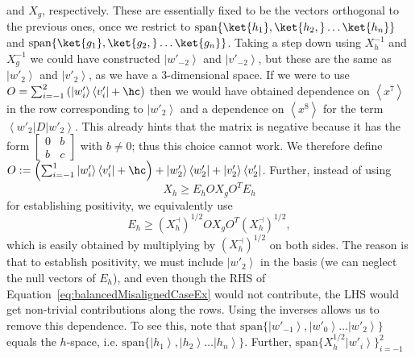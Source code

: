 \documentclass{article}
\begin{document}
and $X_{g}$, respectively. These are essentially fixed to be the vectors orthogonal to the previous ones, once we restrict to $\text{span}\{\ket{h_1},\ket{h_2,}\ldots\ket{h_n}\}$ and $\text{span}\{\ket{g_1},\ket{g_2,}\ldots\ket{g_n}\}$.  Taking a step down using $X_{h}^{-1}$ and $X_{g}^{-1}$ we could
have constructed $\left|w'_{-2}\right\rangle $ and $\left|v'_{-2}\right\rangle $, but these are the same as $\left|w'_{2}\right\rangle $
and $\left|v'_{2}\right\rangle$, as we have a 3-dimensional space. If
we were to use $O=\sum_{i=-1}^{2}\left(\left|w'_{i}\right\rangle \left\langle v'_{i}\right|+\hc\right)$
then we would have obtained dependence on $\left\langle x^{7}\right\rangle $
in the row corresponding to $\left|w'_{2}\right\rangle $ and
a dependence on $\left\langle x^{8}\right\rangle $ for the term
$\left\langle w'_{2}\right|D\left|w'_{2}\right\rangle $. This
already hints that the matrix is negative because it has the form
$\left[\begin{array}{cc}
      0 & b \\
      b & c
    \end{array}\right]$ with $b\neq0$; thus this choice cannot work. We therefore
define $O:=\left(\sum_{i=-1}^{1}\left|w'_{i}\right\rangle \left\langle v'_{i}\right|+\hc\right)+\left|w'_{2}\right\rangle \left\langle w'_{2}\right|+\left|v'_{2}\right\rangle \left\langle v'_{2}\right|$. Further, instead of using
\begin{equation}
  X_{h}\ge E_{h}OX_{g}O^{T}E_{h}\label{eq:balancedMisalignedCaseEx}
\end{equation}
for establishing positivity, we equivalently use
\begin{equation}
  E_{h}\ge\left(X_{h}^{\dashv}\right)^{1/2}OX_{g}O^{T}\left(X_{h}^{\dashv}\right)^{1/2},\label{eq:balancedMisalignedInvertedEx}
\end{equation}
which is easily obtained by multiplying by $(X_{h}^{\dashv})^{1/2}$
on both sides. The reason is that to establish positivity, we
must include $\left|w'_{2}\right\rangle $ in the basis (we can neglect
the null vectors of $E_{h}$), and even though the RHS of Equation~\eqref{eq:balancedMisalignedCaseEx}
would not contribute, the LHS would get non-trivial contributions
along the rows. Using the
inverses allows us to remove this dependence. To see this, note that $\text{span}\{\left|w'_{-1}\right\rangle ,\left|w'_{0}\right\rangle \dots\left|w'_{2}\right\rangle \}$
equals the $h$-space, i.e. $\text{span}\{\left|h_{1}\right\rangle ,\left|h_{2}\right\rangle \dots\left|h_{n}\right\rangle \}$.
Further, $\text{span}\{X_{h}^{1/2}\left|w'_{i}\right\rangle \}_{i=-1}^{2}$
\end{document}
